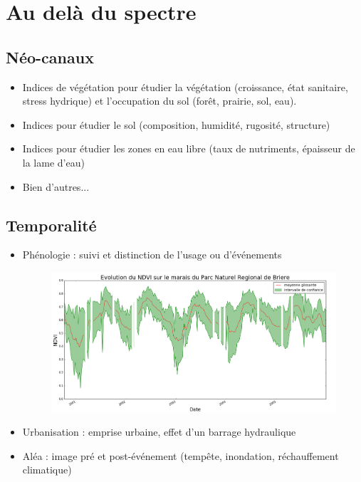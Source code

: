 \documentclass[11pt]{beamer}
\begin{document}
\section{Au delà du spectre}
\subsection{Néo-canaux}
\begin{frame}{}
\begin{itemize}
\item Indices de végétation pour étudier la végétation (croissance, état sanitaire, stress hydrique) et l'occupation du sol (forêt, prairie, sol, eau).
\item Indices pour étudier le sol (composition, humidité, rugosité, structure)
\item Indices pour étudier les zones en eau libre (taux de nutriments, épaisseur de la lame d'eau)
\item Bien d'autres...
\end{itemize}
\end{frame}

\subsection{Temporalité}
\begin{frame}{}
\begin{itemize}

\item Phénologie : suivi et distinction de l'usage ou d’événements
\begin{figure}[!h]
\centering
\includegraphics[scale=0.22]{img/NDVI_Briere.png}
\end{figure}
\item Urbanisation : emprise urbaine, effet d'un barrage hydraulique
\item Aléa : image pré et post-événement (tempête, inondation, réchauffement climatique)
\end{itemize}
\end{frame}
\end{document}
